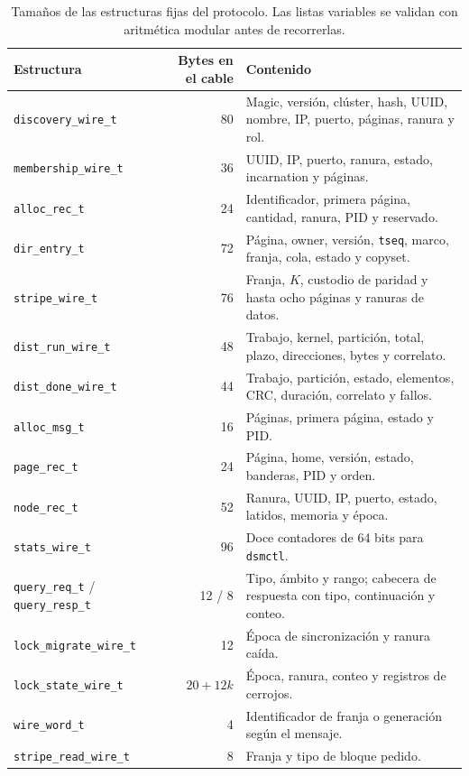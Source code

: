 \begin{table}[H]
\centering
\small
\begin{tabularx}{\linewidth}{l r Y}
\toprule
\textbf{Estructura} & \textbf{Bytes en el cable} & \textbf{Contenido} \\
\midrule
\texttt{discovery\_wire\_t} & 80 & Magic, versión, clúster, hash, UUID, nombre, IP, puerto, páginas, ranura y rol. \\
\texttt{membership\_wire\_t} & 36 & UUID, IP, puerto, ranura, estado, incarnation y páginas. \\
\texttt{alloc\_rec\_t} & 24 & Identificador, primera página, cantidad, ranura, PID y reservado. \\
\texttt{dir\_entry\_t} & 72 & Página, owner, versión, \texttt{tseq}, marco, franja, cola, estado y copyset. \\
\texttt{stripe\_wire\_t} & 76 & Franja, $K$, custodio de paridad y hasta ocho páginas y ranuras de datos. \\
\texttt{dist\_run\_wire\_t} & 48 & Trabajo, kernel, partición, total, plazo, direcciones, bytes y correlato. \\
\texttt{dist\_done\_wire\_t} & 44 & Trabajo, partición, estado, elementos, CRC, duración, correlato y fallos. \\
\texttt{alloc\_msg\_t} & 16 & Páginas, primera página, estado y PID. \\
\texttt{page\_rec\_t} & 24 & Página, home, versión, estado, banderas, PID y orden. \\
\texttt{node\_rec\_t} & 52 & Ranura, UUID, IP, puerto, estado, latidos, memoria y época. \\
\texttt{stats\_wire\_t} & 96 & Doce contadores de 64 bits para \texttt{dsmctl}. \\
\texttt{query\_req\_t} / \texttt{query\_resp\_t} & 12 / 8 & Tipo, ámbito y rango; cabecera de respuesta con tipo, continuación y conteo. \\
\texttt{lock\_migrate\_wire\_t} & 12 & Época de sincronización y ranura caída. \\
\texttt{lock\_state\_wire\_t} & $20 + 12k$ & Época, ranura, conteo y registros de cerrojos. \\
\texttt{wire\_word\_t} & 4 & Identificador de franja o generación según el mensaje. \\
\texttt{stripe\_read\_wire\_t} & 8 & Franja y tipo de bloque pedido. \\
\bottomrule
\end{tabularx}
\caption{Tamaños de las estructuras fijas del protocolo. Las listas variables se validan con aritmética modular antes de recorrerlas.}
\label{tab:cargas-utiles}
\end{table}

